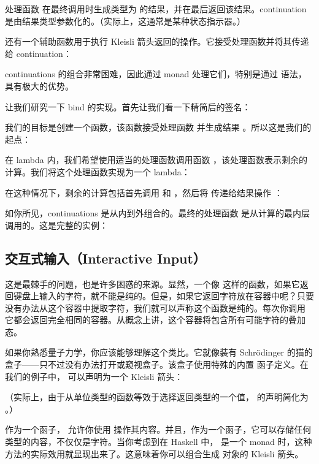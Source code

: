 处理函数  在最终调用时生成类型为  的结果，并在最后返回该结果。continuation 是由结果类型参数化的。（实际上，这通常是某种状态指示器。）

还有一个辅助函数用于执行 Kleisli 箭头返回的操作。它接受处理函数并将其传递给 continuation：

continuations 的组合非常困难，因此通过 monad 处理它们，特别是通过  语法，具有极大的优势。

让我们研究一下 bind 的实现。首先让我们看一下精简后的签名：

我们的目标是创建一个函数，该函数接受处理函数  并生成结果 。所以这是我们的起点：

在 lambda 内，我们希望使用适当的处理函数调用函数 ，该处理函数表示剩余的计算。我们将这个处理函数实现为一个 lambda：

在这种情况下，剩余的计算包括首先调用  和 ，然后将  传递给结果操作 ：

如你所见，continuations 是从内到外组合的。最终的处理函数  是从计算的最内层调用的。这是完整的实例：


\subsection{交互式输入（Interactive Input）}

这是最棘手的问题，也是许多困惑的来源。显然，一个像  这样的函数，如果它返回键盘上输入的字符，就不能是纯的。但是，如果它返回字符放在容器中呢？只要没有办法从这个容器中提取字符，我们就可以声称这个函数是纯的。每次你调用  它都会返回完全相同的容器。从概念上讲，这个容器将包含所有可能字符的叠加态。

如果你熟悉量子力学，你应该能够理解这个类比。它就像装有 Schrödinger 的猫的盒子——只不过没有办法打开或窥视盒子。该盒子使用特殊的内置  函子定义。在我们的例子中， 可以声明为一个 Kleisli 箭头：

（实际上，由于从单位类型的函数等效于选择返回类型的一个值， 的声明简化为 。）

作为一个函子， 允许你使用  操作其内容。并且，作为一个函子，它可以存储任何类型的内容，不仅仅是字符。当你考虑到在 Haskell 中， 是一个 monad 时，这种方法的实际效用就显现出来了。这意味着你可以组合生成  对象的 Kleisli 箭头。

